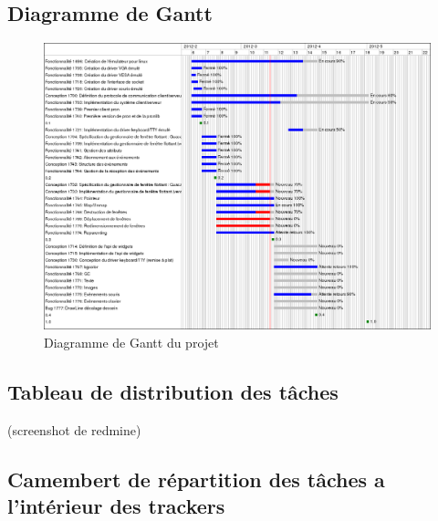 \subsection{Diagramme de Gantt}

\begin{figure}[H]
  \centering
    \includegraphics[width=15cm]{figures/tacos-gui-gantt}
  \caption{Diagramme de Gantt du projet}
  \label{fig:diagGant}
\end{figure}

\subsection{Tableau de distribution des tâches}
(screenshot de redmine)
\subsection{Camembert de répartition des tâches a l'intérieur des trackers}
